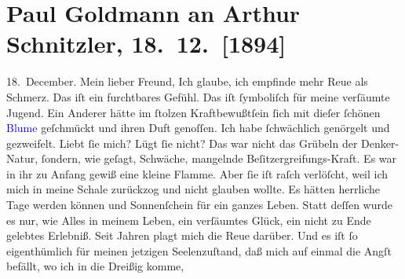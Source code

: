 

               \section[Paul Goldmann an Arthur Schnitzler, 18. 12. {[}1894{]}]{ Paul Goldmann an Arthur Schnitzler, 18. 12. {[}1894{]}}\nopagebreak{}\rehead{ }\normalsize\beginnumbering{} \toendnotes[C]{\smallbreak\pagebreak[2]} 
\toendnotes[C]{\smallbreak}\pstart
           \raggedleft{}{\pb}18. December.\pend
           \pstart\center{}Mein lieber Freund,\pend\pstart
           Ich glaube, ich empfinde mehr Reue als Schmerz. Das iſt ein furchtbares Gefühl. Das
                  \label{K_mets_Goldmann_94-partII-4v}\label{K_mets_Goldmann_94-partII-4h} iſt ſymboliſch für meine verſäumte
               Jugend. Ein Anderer hätte im ſtolzen Kraftbewußtſein ſich mit dieſer ſchönen \textcolor{blue}{Blume}{} geſchmückt und ihren
               Duft genoſſen. Ich habe ſchwächlich genörgelt und gezweifelt. Liebt ſie mich? Lügt
               ſie nicht? Das war nicht das Grübeln der Denker-Natur, ſondern, wie geſagt, Schwäche,
               mangelnde Beſitzergreifungs-Kraft. Es war in ihr zu Anfang gewiß eine kleine Flamme.
               Aber ſie iſt {\pb}raſch verlöſcht, weil ich mich in
               meine Schale zurückzog und nicht glauben wollte. Es hätten herrliche Tage werden
               können und Sonnenſchein für ein ganzes Leben. Statt deſſen wurde es nur, wie Alles in
               meinem Leben, ein verſäumtes Glück, ein nicht zu Ende gelebtes Erlebniß. Seit Jahren
               plagt mich die Reue darüber. Und es iſt ſo eigenthümlich für meinen jetzigen
               Seelenzuſtand, daß mich auf einmal die Angſt befällt, wo ich in die Dreißig komme,

